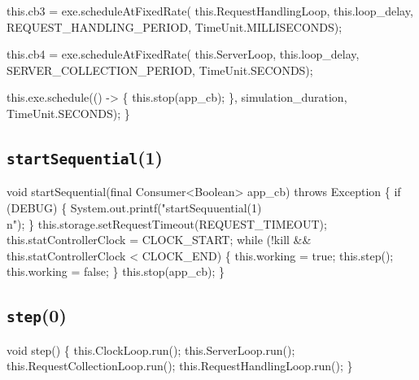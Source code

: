   this.cb3 = exe.scheduleAtFixedRate(
    this.RequestHandlingLoop, this.loop_delay, REQUEST_HANDLING_PERIOD, TimeUnit.MILLISECONDS);

  this.cb4 = exe.scheduleAtFixedRate(
    this.ServerLoop, this.loop_delay, SERVER_COLLECTION_PERIOD, TimeUnit.SECONDS);

  this.exe.schedule(() -> \{
    this.stop(app_cb);
  \}, simulation_duration, TimeUnit.SECONDS);
\}
\eatline
{}\nwendcode{}\nwdocspar
\subsection{\texttt{startSequential}(1)}
\nwenddocs{}\endmoddef{}
void startSequential(final Consumer<Boolean> app_cb) throws Exception \{
  if (DEBUG) \{
    System.out.printf("startSequuential(1)\\n");
  \}
  this.storage.setRequestTimeout(REQUEST_TIMEOUT);
  this.statControllerClock = CLOCK_START;
  while (!kill && this.statControllerClock < CLOCK_END) \{
    this.working = true;
    this.step();
    this.working = false;
  \}
  this.stop(app_cb);
\}
\eatline
{}\nwendcode{}\nwdocspar
\subsection{\texttt{step}(0)}
\nwenddocs{}\endmoddef{}
void step() \{
  this.ClockLoop.run();
  this.ServerLoop.run();
  this.RequestCollectionLoop.run();
  this.RequestHandlingLoop.run();
\}
\nwendcode{}\nwdocspar

